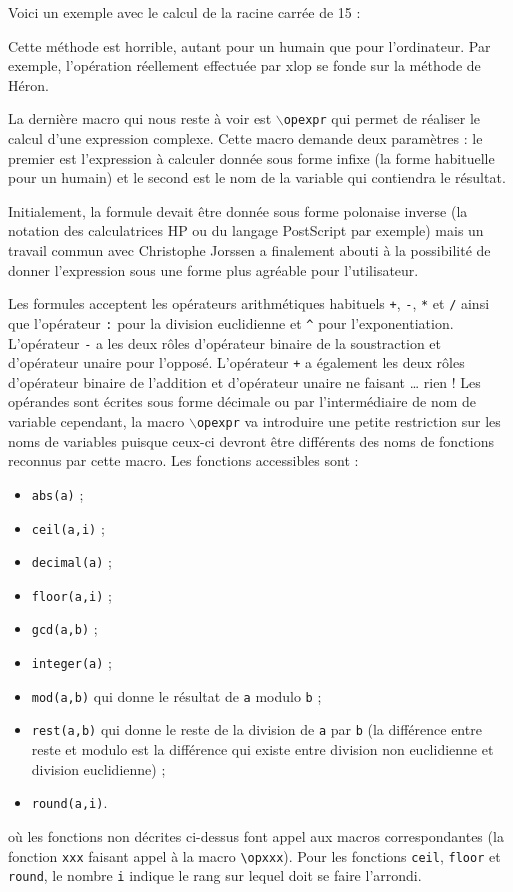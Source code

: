 \documentclass[12pt]{report}
\makeatletter
\newcommand\package[1]{\textsf{#1}}
\newcommand\macro[1]{\texttt{$\backslash$#1}\index{#1@\texttt{\boi {#1}}}}
\makeatother
\begin{document}
Voici un exemple avec le calcul de la racine carrée de 15 :
\begin{CenterExample}
\end{CenterExample}
Cette méthode est horrible, autant pour un humain que pour
l'ordinateur. Par exemple, l'opération réellement effectuée par
\package{xlop} se fonde sur la méthode de Héron.

La dernière macro qui nous reste à voir est \macro{opexpr} qui permet
de réaliser le calcul d'une expression complexe. Cette macro demande
deux paramètres : le premier est l'expression à calculer donnée sous
forme infixe (la forme habituelle pour un humain) et le second est le
nom de la variable qui contiendra le résultat.

Initialement, la formule devait être donnée sous forme polonaise
inverse (la notation des calculatrices HP ou du langage PostScript par
exemple) mais un travail commun avec Christophe Jorssen a finalement
abouti à la possibilité de donner l'expression sous une forme plus
agréable pour l'utilisateur.

Les formules acceptent les opérateurs arithmétiques habituels
\texttt{+}, \texttt{-}, \texttt{*} et \texttt{/} ainsi que l'opérateur
\texttt{:} pour la division euclidienne et \verb+^+ pour
l'exponentiation. L'opérateur \texttt{-} a les deux rôles d'opérateur
binaire de la soustraction et d'opérateur unaire pour l'opposé.
L'opérateur \texttt{+} a également les deux rôles d'opérateur binaire
de l'addition et d'opérateur unaire ne faisant \ldots{} rien ! Les
opérandes sont écrites sous forme décimale ou par l'intermédiaire de
nom de variable cependant, la macro \macro{opexpr} va introduire une
petite restriction sur les noms de variables puisque ceux-ci devront
être différents des noms de fonctions reconnus par cette macro. Les
fonctions accessibles sont :
\begin{itemize}
\item \texttt{abs(a)} ;
\item \texttt{ceil(a,i)} ;
\item \texttt{decimal(a)} ;
\item \texttt{floor(a,i)} ;
\item \texttt{gcd(a,b)} ;
\item \texttt{integer(a)} ;
\item \texttt{mod(a,b)} qui donne le résultat de \texttt{a} modulo
  \texttt{b} ;
\item \texttt{rest(a,b)} qui donne le reste de la division de
  \texttt{a} par \texttt{b} (la différence entre reste et modulo est
  la différence qui existe entre division non euclidienne et division
  euclidienne) ;
\item \texttt{round(a,i)}.
\end{itemize}
où les fonctions non décrites ci-dessus font appel aux macros
correspondantes (la fonction \texttt{xxx} faisant appel à la macro
\verb+\opxxx+). Pour les fonctions \texttt{ceil}, \texttt{floor} et
\texttt{round}, le nombre \texttt{i} indique le rang sur lequel doit
se faire l'arrondi.
\end{document}
